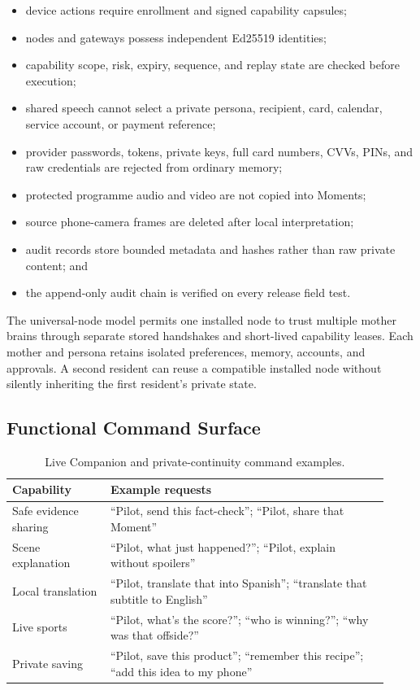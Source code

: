 \begin{itemize}
    \item device actions require enrollment and signed capability capsules;
    \item nodes and gateways possess independent Ed25519 identities;
    \item capability scope, risk, expiry, sequence, and replay state are checked
    before execution;
    \item shared speech cannot select a private persona, recipient, card, calendar,
    service account, or payment reference;
    \item provider passwords, tokens, private keys, full card numbers, CVVs, PINs,
    and raw credentials are rejected from ordinary memory;
    \item protected programme audio and video are not copied into Moments;
    \item source phone-camera frames are deleted after local interpretation;
    \item audit records store bounded metadata and hashes rather than raw private
    content; and
    \item the append-only audit chain is verified on every release field test.
\end{itemize}

The universal-node model permits one installed node to trust multiple mother
brains through separate stored handshakes and short-lived capability leases.
Each mother and persona retains isolated preferences, memory, accounts, and
approvals.  A second resident can reuse a compatible installed node without
silently inheriting the first resident's private state.

\subsection{Functional Command Surface}

\begin{table}[htbp]
\centering
\small
\begin{tabular}{p{0.24\linewidth} p{0.68\linewidth}}
\toprule
Capability & Example requests \\
\midrule
Safe evidence sharing & ``Pilot, send this fact-check''; ``Pilot, share that Moment'' \\
Scene explanation & ``Pilot, what just happened?''; ``Pilot, explain without spoilers'' \\
Local translation & ``Pilot, translate that into Spanish''; ``translate that subtitle to English'' \\
Live sports & ``Pilot, what's the score?''; ``who is winning?''; ``why was that offside?'' \\
Private saving & ``Pilot, save this product''; ``remember this recipe''; ``add this idea to my phone'' \\
\bottomrule
\end{tabular}
\caption{Live Companion and private-continuity command examples.}
\label{tab:pilot-live-command-surface}
\end{table}

